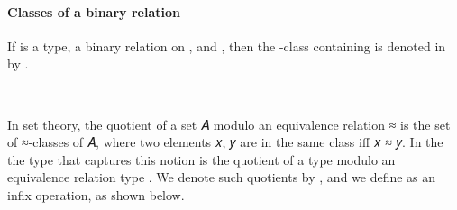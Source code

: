 \documentclass[a4paper,USenglish,cleveref,autoref,thm-restate]{lipics-v2019}
\begin{document}
\paragraph*{Classes of a binary relation}
If \AgdaSpace{}\AgdaSymbol{:}\AgdaSpace{} is a type,
 a binary relation on , and \AgdaSpace{}\AgdaSymbol{:}\AgdaSpace{},
then the -class containing  is denoted in \agdaualib by
\AgdaOperator{\AgdaFunction{[}}\AgdaSpace{}\AgdaSpace{}\AgdaOperator{\AgdaFunction{]}}\AgdaSpace{}.
\begin{code}
\>[0]\AgdaOperator{\AgdaFunction{[\AgdaUnderscore{}]\AgdaUnderscore{}}}\AgdaSpace{}%
\AgdaSymbol{:}%
\>[8]\AgdaSymbol{\{}\AgdaSpace{}%
\AgdaSymbol{:}\AgdaSpace{}%
\AgdaSpace{}%
\AgdaSpace{}%
\AgdaSymbol{\}}\AgdaSpace{}%
%
\>[22]\AgdaSymbol{(}\AgdaSpace{}%
\AgdaSymbol{:}\AgdaSpace{}%
\AgdaSymbol{)}\AgdaSpace{}%
\AgdaSpace{}%
\AgdaSpace{}%
\AgdaSpace{}%
\AgdaSpace{}%
\AgdaSpace{}%
\AgdaSpace{}%
\AgdaSpace{}%
\AgdaSpace{}%
\<%
\\
\>[0]\AgdaOperator{\AgdaFunction{[}}\AgdaSpace{}%
\AgdaSpace{}%
\AgdaOperator{\AgdaFunction{]}}\AgdaSpace{}%
\AgdaSpace{}%
\AgdaSymbol{=}\AgdaSpace{}%
\AgdaSpace{}%
\AgdaSpace{}%
\AgdaSpace{}%
\AgdaSymbol{\AgdaUnderscore{}}\AgdaSpace{}%
\AgdaFunction{,}%
\>[21]\AgdaSpace{}%
\AgdaSpace{}%
\<%
\end{code}
In set theory, the quotient of a set 𝐴 modulo an equivalence relation ≈ is the set of ≈-classes of 𝐴, where two elements 𝑥, 𝑦 are in the same class iff 𝑥 ≈ 𝑦. In the \agdaualib the type that captures this notion is the quotient of a type  modulo an equivalence relation type . We denote such quotients by \AgdaSpace{}\AgdaOperator{\AgdaFunction{//}}\AgdaSpace{}, and we define \AgdaOperator{\AgdaFunction{\AgdaUnderscore{}//\AgdaUnderscore{}}}\AgdaSpace{} as an infix operation, as shown below.
\end{document}

